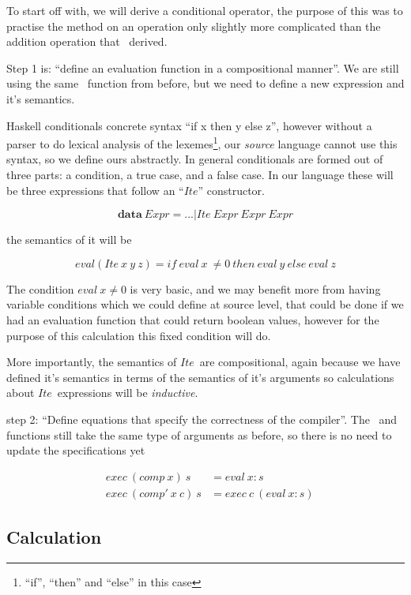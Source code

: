 \documentclass {article}
\begin{document}
To start off with, we will derive a conditional operator,
the purpose of this was to practise the method
on an operation only slightly more complicated than
the addition operation that \BH\ derived.

\newcommand{\ite}{$Ite$}

Step 1 is: 
``define an evaluation function in a compositional manner''.
We are still using the same \eval\ function from before,
but we need to define a new 
expression and it's semantics.

Haskell conditionals concrete
syntax ``if  x then y else z'',
however without a parser to do
lexical analysis\cite[chapter 2.2]{dragon} of the lexemes\footnote{
``if'', ``then'' and ``else'' in this case},
our \emph{source} language cannot use this
syntax, so we define ours abstractly.
In general conditionals are formed out of three parts:
a condition, a true case, and a false case.
In our language these will be three expressions
that follow an ``\ite'' constructor.

	\[ \textbf{data} \ Expr = ... | Ite \ Expr \ Expr \ Expr \]

the semantics of it will be

	\[eval(Ite \ x \ y \ z) = if \ eval \ x \ \not= 0 \ then \ eval \ y \ else \ eval \ z \]

The condition $eval \ x  \not= 0$ is very basic,
and we may benefit more from having variable conditions
which we could define at source level,
that could be done if we had an evaluation function 
that could return boolean values, 
however for the purpose of this calculation
this fixed condition will do.

More importantly, the semantics of \ite\
are compositional, 
again because we have defined it's
semantics in terms of the semantics of 
it's arguments so
calculations about \ite\ expressions
will be \emph{inductive}.

step 2: ``Define equations that specify the correctness of the compiler''.
The \vm\ and \comp functions still take the same
type of arguments as before,
so there is no need to update the specifications yet

\begin{eqnarray}
	 &exec \  (comp \  x) \  s &= eval \  x:s \\
	 &exec \  (comp' \  x \  c) \ s &= exec \  c \  (eval \ x:s) 
\end{eqnarray}

\subsection{Calculation}
\end{document}
